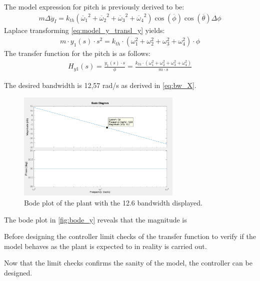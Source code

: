 The model expression for pitch is previously derived to be:
\begin{align}
m\Delta\ddot{y}_I = k_{th}({\overline{\omega}_1}^2+{\overline{\omega}_2}^2+{\overline{\omega}_3}^2+{\overline{\omega}_4}^2)\cos(\overline{\phi})\cos(\overline{\theta})\Delta\phi
\label{eq:model_y_transl}
\end{align}
Laplace transforming \autoref{eq:model_y_transl_y} yields:
\begin{align}
m\cdot y_1(s)\cdot s^2= k_{th}\cdot (\omega_1 ^2 + \omega_2 ^2 + \omega_3 ^2 + \omega_4 ^2)\cdot \phi
\end{align}
The transfer function for the pitch is as follows:
\begin{align}
H_{y1}(s)=\frac{y_1(s)\cdot s}{\phi}=\frac{k_{th}\cdot (\omega_1 ^2 + \omega_2 ^2 + \omega_3 ^2 + \omega_4 ^2)}{m\cdot s}
\end{align}
\begin{where}
\end{where}
 
The desired bandwidth is 12,57 rad/s as derived in \autoref{eq:bw_X}. 

\begin{figure}[H]
	\centering
	\includegraphics[width=0.7\textwidth]{figures/bode_y.png}
	\caption{Bode plot of the plant with the 12.6 bandwidth displayed.}\label{fig:bode_y}
\end{figure}
The bode plot in \autoref{fig:bode_y} reveals that the magnitude is 






Before designing the controller limit checks of the transfer function to verify if the model behaves as the plant is expected to in reality is carried out. \\

Now that the limit checks confirms the sanity of the model, the controller can be designed. \\